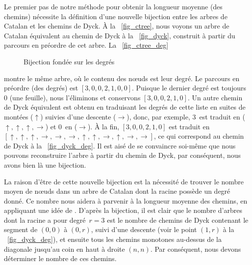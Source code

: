 Le premier pas de notre méthode pour obtenir la longueur moyenne (des
chemins) nécessite la définition d'une nouvelle bijection entre les
arbres de Catalan et les chemins de Dyck. À la \fig~\vref{fig_ctree},
nous voyons un arbre de Catalan équivalent au chemin de Dyck à la
\fig~\ref{fig_dyck}, construit à partir du parcours en préordre de cet
arbre. La \fig~\ref{fig_ctree_deg}
\begin{figure}
\centering
{}
\qquad
{}
\caption{Bijection fondée sur les degrés\label{fig_bijection_deg}}
\end{figure}
montre le même arbre, où le contenu des n{\oe}uds est leur degré. Le
parcours en préordre (des degrés) est \([3,0,0,2,1,0,0]\). Puisque le
dernier degré est toujours~\(0\) (une feuille), nous l'éliminons et
conservons \([3,0,0,2,1,0]\). Un autre chemin de Dyck équivalent est
obtenu en traduisant les degrés de cette liste en suites de montées
(\(\uparrow\)) suivies d'une descente (\(\rightarrow\)), donc, par
exemple, \(3\)~est traduit en (\(\uparrow, \uparrow, \uparrow,
\rightarrow\)) et \(0\)~en (\(\rightarrow\)). À la fin,
\([3,0,0,2,1,0]\) est traduit en \([\uparrow, \uparrow, \uparrow,
\rightarrow, \rightarrow, \rightarrow, \uparrow, \uparrow,
\rightarrow, \uparrow, \rightarrow, \rightarrow]\), ce qui correspond
au chemin de Dyck à la \fig~\ref{fig_dyck_deg}. Il est aisé de se
convaincre soi-même que nous pouvons reconstruire l'arbre à partir du
chemin de Dyck, par conséquent, nous avons bien là une bijection.

La raison d'être de cette nouvelle bijection est la nécessité de
trouver le nombre moyen de n{\oe}uds dans un arbre de Catalan dont la
racine possède un degré donné. Ce nombre nous aidera à parvenir à la
longueur moyenne des chemins, en appliquant une idée de
\cite{Ruskey_1983}. D'après la bijection, il est clair que le nombre
d'arbres dont la racine a pour degré~\(r=3\) est le nombre de chemins
de Dyck contenant le segment de \((0,0)\) à \((0,r)\), suivi d'une
descente (voir le point \((1,r)\) à la \fig~\ref{fig_dyck_deg}), et
ensuite tous les chemins monotones au-dessus de la diagonale jusqu'au
coin en haut à droite \((n,n)\).  Par conséquent, nous devons
déterminer le nombre de ces chemins.

